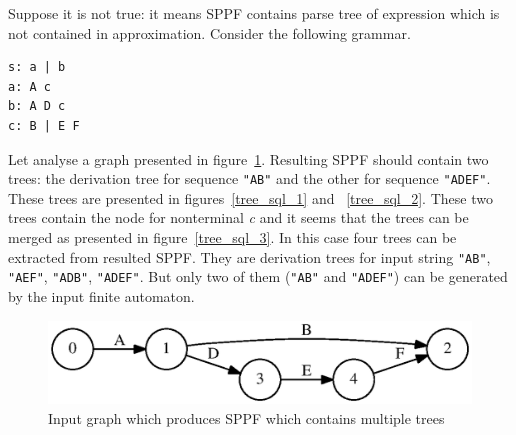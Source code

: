 \documentclass{acm_proc_article-sp}
\begin{document}
Suppose it is not true: it means SPPF contains parse tree of expression which is not contained in approximation. Consider the following grammar.

\begin{verbatim}
s: a | b
a: A c
b: A D c
c: B | E F
\end{verbatim}

Let analyse a graph presented in figure~\ref{SPPF_proof_input}. Resulting SPPF should contain two trees: the derivation tree for sequence \verb|"AB"| and the other for sequence \verb|"ADEF"|. These trees are presented in figures~\ref{tree_sql_1} and ~\ref{tree_sql_2}. These two trees contain the node for nonterminal {\it c} and it seems that the trees can be merged as presented in figure~\ref{tree_sql_3}. In this case four trees can be extracted from resulted SPPF. They are derivation trees for input string \verb|"AB"|, \verb|"AEF"|, \verb|"ADB"|, \verb|"ADEF"|. But only two of them (\verb|"AB"| and \verb|"ADEF"|) can be generated by the input finite automaton.  

\begin{figure}[h!]
    \begin{center}
        \includegraphics[scale=0.4]{graphs/SPPF_proof_input.eps}
    \end{center}
    \caption{Input graph which produces SPPF which contains multiple trees}
    \label{SPPF_proof_input}
\end{figure}
 
\end{document}
